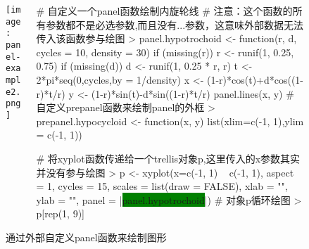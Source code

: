 \begin{frame}[c,fragile]{\subsecname}{\subsubsecname}
\begin{figure}
 \begin{columns}
    \begin{column}[c]{.45\textwidth}
        \texttt{[image: panel-example2.png]}
    \end{column}

    \begin{column}[c]{.55\textwidth}
\begin{rcode}
# 自定义一个panel函数绘制内旋轮线
# 注意：这个函数的所有参数都不是必选参数,而且没有...参数，这意味外部数据无法传入该函数参与绘图
> panel.hypotrochoid <- function(r, d, cycles = 10, density = 30)
 {
     if (missing(r)) r <- runif(1, 0.25, 0.75)
     if (missing(d)) d <- runif(1, 0.25 * r, r)
     t <- 2*pi*seq(0,cycles,by = 1/density)
     x <- (1-r)*cos(t)+d*cos((1-r)*t/r)
     y <- (1-r)*sin(t)-d*sin((1-r)*t/r)
     panel.lines(x, y)
 }
# 自定义prepanel函数来绘制panel的外框
> prepanel.hypocycloid <- function(x, y) {
     list(xlim=c(-1, 1),ylim = c(-1, 1))
 }

# 将xyplot函数传递给一个trellis对象p,这里传入的x参数其实并没有参与绘图
> p <- xyplot(x=c(-1, 1) ~ c(-1, 1), aspect = 1, cycles = 15, scales = list(draw = FALSE), xlab = "", ylab = "", panel = |\colorbox{green}{panel.hypotrochoid}|)
# 对象p循环绘图
> p[rep(1, 9)]
\end{rcode}
    \end{column}
  \end{columns}
  \caption{通过外部自定义panel函数来绘制图形}
\end{figure}
\end{frame} 

